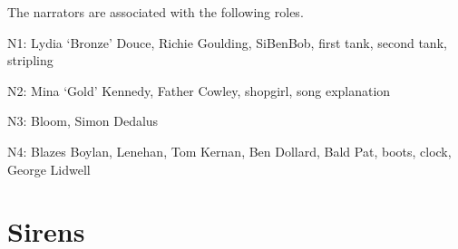 The narrators are associated with the following roles.

\smallskip

N1: Lydia ‘Bronze’ Douce,
Richie Goulding,
SiBenBob,
first tank,
second tank,
stripling

N2: Mina ‘Gold’ Kennedy,
Father Cowley,
shopgirl,
song explanation

N3: Bloom,
Simon Dedalus

N4: Blazes Boylan,
Lenehan,
Tom Kernan,
Ben Dollard,
Bald Pat,
boots,
clock,
George Lidwell

\thispagestyle{empty}
\newpage


\setcounter{page}{1}

\section*{Sirens}




